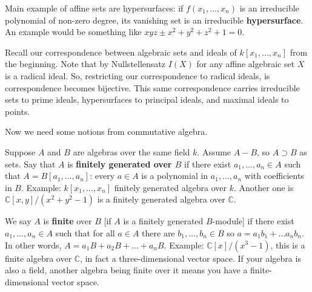 \documentclass[12pt]{article}
\newcommand{\C}{\mathbb{C}}
\begin{document}
    Main example of affine sets are hypersurfaces: if $f(x_1, \dots, x_n)$ is an irreducible polynomial of non-zero degree, its vanishing set is an irreducible \textbf{hypersurface}. An example would be something like $xyz \pm x^2 + y^2 + z^2 + 1 = 0$. \par 
    Recall our correspondence between algebraic sets and ideals of $k[x_1, \dots, x_n]$ from the beginning. Note that by Nullstellensatz $I(X)$ for any affine algebraic set $X$ is a radical ideal. So, restricting our correspondence to radical ideals, is correspondence becomes bijective. This same correspondence carries irreducible sets to prime ideals, hypersurfaces to principal ideals, and maximal ideals to points. \par 
    Now we need some notions from commutative algebra. \par 
    Suppose $A$ and $B$ are algebras over the same field $k$. Assume $A - B$, so $A \supset B$ as sets. Say that $A$ is \textbf{finitely generated over $B$} if there exist $a_1, \dots, a_n \in A$ such that $A = B[a_1, \dots, a_n]$: every $a \in A$ is a polynomial in $a_1, \dots, a_n$ with coefficients in $B$. Example: $k[x_1,\dots, x_n]$ finitely generated algebra over $k$. Another one is $\C[x, y]/(x^2 + y^2 - 1)$ is a finitely generated algebra over $\C$. \par 
    We say $A$ is \textbf{finite} over $B$ [if $A$ is a finitely generated $B$-module] if there exist $a_1, \dots, a_n \in A$ such that for all $a \in A$ there are $b_1, \dots, b_n \in B$ so $a = a_1b_1 + \dots a_n b_n$. In other words, $A = a_1B + a_2B + \dots + a_nB$. Example: $\C[x]/(x^3 - 1)$, this is a finite algebra over $\C$, in fact a three-dimensional vector space. If your algebra is also a field, another algebra being finite over it means you have a finite-dimensional vector space.  
\end{document}
